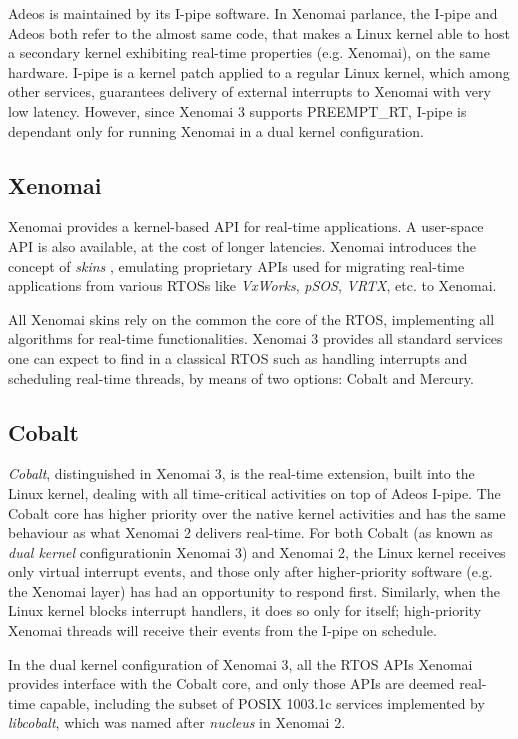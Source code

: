 \documentclass[10pt,a4paper]{article}
\begin{document}
\begin{multicols}{2}
Adeos is maintained by its I-pipe software. In Xenomai parlance, the I-pipe and Adeos both refer to the almost same code, that makes a Linux kernel able to host a secondary kernel exhibiting real-time properties (e.g. Xenomai), on the same hardware. I-pipe is a kernel patch applied to a regular Linux kernel, which among other services, guarantees delivery of external interrupts to Xenomai with very low latency. However, since Xenomai 3 supports PREEMPT\_RT, I-pipe is dependant only for running Xenomai in a dual kernel configuration.

\subsection{Xenomai}

Xenomai provides a kernel-based API for real-time applications. A user-space API is also available, at the cost of longer latencies. Xenomai introduces the concept of \textit{skins} \cite{ChameleonRTOS}, emulating proprietary APIs used for migrating real-time applications from various RTOSs like \textit{VxWorks}, \textit{pSOS}, \textit{VRTX}, etc. to Xenomai.

All Xenomai skins rely on the common the core of the RTOS, implementing all algorithms for real-time functionalities. Xenomai 3 provides all standard services one can expect to find in a classical RTOS such as handling interrupts and scheduling real-time threads, by means of two options: Cobalt and Mercury.

\subsection{Cobalt}

\textit{Cobalt}, distinguished in Xenomai 3, is the real-time extension, built into the Linux kernel, dealing with all time-critical activities on top of Adeos I-pipe. The Cobalt core has higher priority over the native kernel activities and has the same behaviour as what Xenomai 2 delivers real-time. For both Cobalt (as known as \textit{dual kernel} configurationin Xenomai 3) and Xenomai 2, the Linux kernel receives only virtual interrupt events, and those only after higher-priority software (e.g. the Xenomai layer) has had an opportunity to respond first. Similarly, when the Linux kernel blocks interrupt handlers, it does so only for itself; high-priority Xenomai threads will receive their events from the I-pipe on schedule.

In the dual kernel configuration of Xenomai 3, all the RTOS APIs Xenomai provides interface with the Cobalt core, and only those APIs are deemed real-time capable, including the subset of POSIX 1003.1c \cite{posix-1003-1c} services implemented by \textit{libcobalt}, which was named after \textit{nucleus} in Xenomai 2.


\end{multicols}
\end{document}
